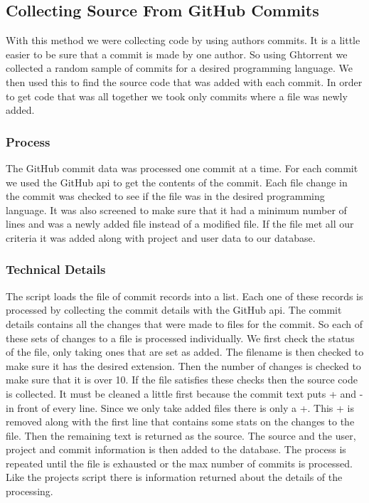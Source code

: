 \documentclass{article}
\begin{document}
\subsection{Collecting Source From GitHub Commits}
With this method we were collecting code by using authors commits. It is a little easier to be sure that a commit is made by one author. So using Ghtorrent we collected a random sample of commits for a desired programming language. We then used this to find the source code that was added with each commit. In order to get code that was all together we took only commits where a file was newly added.

\subsubsection{Process}
The GitHub commit data was processed one commit at a time. For each commit we used the GitHub api to get the contents of the commit. Each file change in the commit was checked to see if the file was in the desired programming language. It was also screened to make sure that it had a minimum number of lines and was a newly added file instead of a modified file. If the file met all our criteria it was added along with project and user data to our database.

\subsubsection{Technical Details}
The script loads the file of commit records into a list. Each one of these records is processed by collecting the commit details with the GitHub api. The commit details contains all the changes that were made to files for the commit. So each of these sets of changes to a file is processed individually. We first check the status of the file, only taking ones that are set as added. The filename is then checked to make sure it has the desired extension. Then the number of changes is checked to make sure that it is over 10. If the file satisfies these checks then the source code is collected. It must be cleaned a little first because the commit text puts + and - in front of every line. Since we only take added files there is only a +. This + is removed along with the first line that contains some stats on the changes to the file. Then the remaining text is returned as the source. The source and the user, project and commit information is then added to the database. The process is repeated until the file is exhausted or the max number of commits is processed. Like the projects script there is information returned about the details of the processing.
\end{document}
